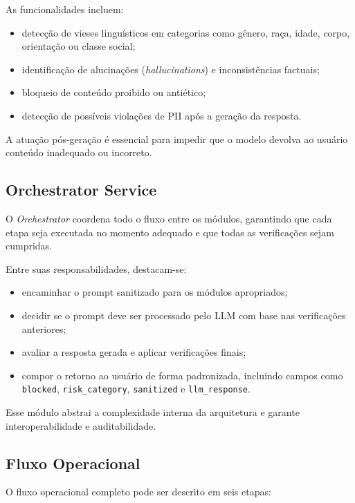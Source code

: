 As funcionalidades incluem:

\begin{itemize}
    \item detecção de vieses linguísticos em categorias como gênero, raça, idade, corpo, orientação ou classe social;
    \item identificação de alucinações (\textit{hallucinations}) e inconsistências factuais;
    \item bloqueio de conteúdo proibido ou antiético;
    \item detecção de possíveis violações de PII após a geração da resposta.
\end{itemize}

A atuação pós-geração é essencial para impedir que o modelo devolva ao usuário conteúdo inadequado ou incorreto.

\subsection{Orchestrator Service}

O \textit{Orchestrator} coordena todo o fluxo entre os módulos, garantindo que cada etapa seja executada no momento adequado e que todas as verificações sejam cumpridas.

Entre suas responsabilidades, destacam-se:

\begin{itemize}
    \item encaminhar o prompt sanitizado para os módulos apropriados;
    \item decidir se o prompt deve ser processado pelo LLM com base nas verificações anteriores;
    \item avaliar a resposta gerada e aplicar verificações finais;
    \item compor o retorno ao usuário de forma padronizada, incluindo campos como \texttt{blocked}, \texttt{risk\_category}, \texttt{sanitized} e \texttt{llm\_response}.
\end{itemize}

Esse módulo abstrai a complexidade interna da arquitetura e garante interoperabilidade e auditabilidade.

\subsection{Fluxo Operacional}

O fluxo operacional completo pode ser descrito em seis etapas:

